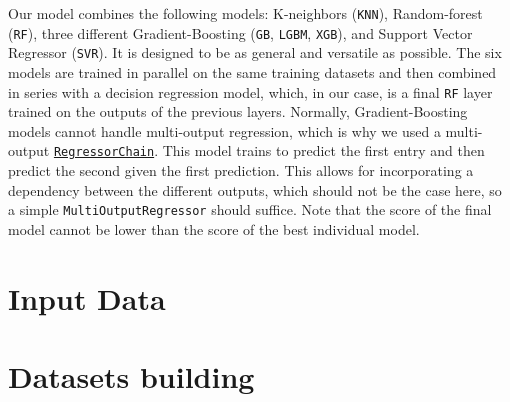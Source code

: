 \documentclass[11pt,a4paper,openany]{report}
\begin{document}
\begin{multicols}{2}
    Our model combines the following models: K-neighbors (\texttt{KNN}), Random-forest (\texttt{RF}), three different Gradient-Boosting (\texttt{GB}, \texttt{LGBM}, \texttt{XGB}), and Support Vector Regressor (\texttt{SVR}). It is designed to be as general and versatile as possible. The six models are trained in parallel on the same training datasets and then combined in series with a decision regression model, which, in our case, is a final \texttt{RF} layer trained on the outputs of the previous layers. Normally, Gradient-Boosting models cannot handle multi-output regression, which is why we used a multi-output \href{https://scikit-learn.org/stable/modules/generated/sklearn.multioutput.RegressorChain.html}{\texttt{RegressorChain}}. This model trains to predict the first entry and then predict the second given the first prediction. This allows for incorporating a dependency between the different outputs, which should not be the case here, so a simple \texttt{MultiOutputRegressor} should suffice. Note that the score of the final model cannot be lower than the score of the best individual model.



    \section{Input Data}


    \section{Datasets building}


\end{multicols}
\end{document}
